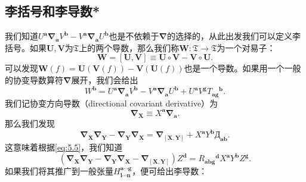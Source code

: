 \subsection{李括号和李导数*}

我们知道$U^{\boldsymbol{a}}\boldsymbol{\nabla }_{\boldsymbol{a}} V^{\boldsymbol{b}} -V^{\boldsymbol{a}}\boldsymbol{\nabla }_{\boldsymbol{a}} U^{\boldsymbol{b}}$也是不依赖于$\boldsymbol{\nabla }$的选择的，从此出发我们可以定义李括号。如果$\boldsymbol{U} ,\boldsymbol{V}$为$\mathfrak{T}$上的两个导数，那么我们称$\boldsymbol{W} :\mathfrak{T}\rightarrow \mathfrak{T}$为一个对易子：
\begin{equation*}
	\boldsymbol{W} =[\boldsymbol{U} ,\boldsymbol{V}] \equiv \boldsymbol{U} \circ \boldsymbol{V} -\boldsymbol{V} \circ \boldsymbol{U} .
\end{equation*}
可以发现$\boldsymbol{W}( f) =\boldsymbol{U}(\boldsymbol{V}( f)) -\boldsymbol{V}(\boldsymbol{U}( f))$也是一个导数。如果用一个一般的协变导数算符$\boldsymbol{\nabla }$展开，我们会给出
\begin{equation*}
	W^{\boldsymbol{b}} =U^{\boldsymbol{a}}\boldsymbol{\nabla }_{\boldsymbol{a}} V^{\boldsymbol{b}} -V^{\boldsymbol{a}}\boldsymbol{\nabla }_{\boldsymbol{a}} U^{\boldsymbol{b}} +U^{\boldsymbol{a}} V^{\boldsymbol{g}} T{_{\boldsymbol{ag}}}^{\boldsymbol{b}} .
\end{equation*}
我们记协变方向导数（directional covariant derivative）为
\begin{equation*}
	\boldsymbol{\nabla }_{\boldsymbol{X}} \equiv X^{\boldsymbol{a}}\boldsymbol{\nabla }_{\boldsymbol{a}} .
\end{equation*}
那么我们发现
\begin{equation*}
	\boldsymbol{\nabla }_{\boldsymbol{X}}\boldsymbol{\nabla }_{\boldsymbol{Y}} -\boldsymbol{\nabla }_{\boldsymbol{Y}}\boldsymbol{\nabla }_{\boldsymbol{X}} =\boldsymbol{\nabla }_{[\boldsymbol{X} ,\boldsymbol{Y}]} +X^{\boldsymbol{a}} Y^{\boldsymbol{b}} \text{Д}_{\boldsymbol{ab}} .
\end{equation*}
这意味着根据\ref{eq:5.5}，我们知道
\begin{equation*}
	(\boldsymbol{\nabla }_{\boldsymbol{X}}\boldsymbol{\nabla }_{\boldsymbol{Y}} -\boldsymbol{\nabla }_{\boldsymbol{Y}}\boldsymbol{\nabla }_{\boldsymbol{X}} -\boldsymbol{\nabla }_{[\boldsymbol{X} ,\boldsymbol{Y}]} )Z^{\boldsymbol{d}} =R{_{\boldsymbol{abg}}}^{\boldsymbol{d}} X^{\boldsymbol{a}} Y^{\boldsymbol{b}} Z^{\boldsymbol{g}} .
\end{equation*}
如果我们将其推广到一般张量$H_{\boldsymbol{l} \cdots \boldsymbol{n}}^{\boldsymbol{a} \cdots \boldsymbol{g}}$，便可给出李导数：
